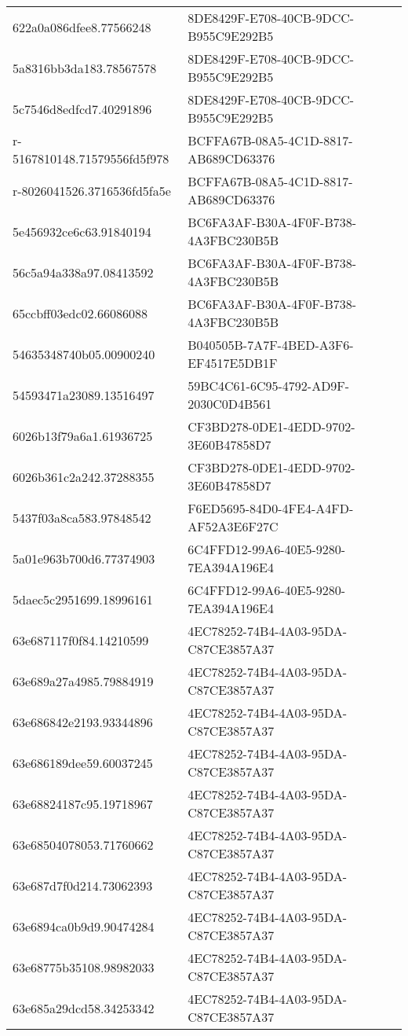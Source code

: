 \begin{tabular}{ll}
622a0a086dfee8.77566248 & 8DE8429F-E708-40CB-9DCC-B955C9E292B5 \\
5a8316bb3da183.78567578 & 8DE8429F-E708-40CB-9DCC-B955C9E292B5 \\
5c7546d8edfcd7.40291896 & 8DE8429F-E708-40CB-9DCC-B955C9E292B5 \\
r-5167810148.71579556fd5f978 & BCFFA67B-08A5-4C1D-8817-AB689CD63376 \\
r-8026041526.3716536fd5fa5e & BCFFA67B-08A5-4C1D-8817-AB689CD63376 \\
5e456932ce6c63.91840194 & BC6FA3AF-B30A-4F0F-B738-4A3FBC230B5B \\
56c5a94a338a97.08413592 & BC6FA3AF-B30A-4F0F-B738-4A3FBC230B5B \\
65ccbff03edc02.66086088 & BC6FA3AF-B30A-4F0F-B738-4A3FBC230B5B \\
54635348740b05.00900240 & B040505B-7A7F-4BED-A3F6-EF4517E5DB1F \\
54593471a23089.13516497 & 59BC4C61-6C95-4792-AD9F-2030C0D4B561 \\
6026b13f79a6a1.61936725 & CF3BD278-0DE1-4EDD-9702-3E60B47858D7 \\
6026b361c2a242.37288355 & CF3BD278-0DE1-4EDD-9702-3E60B47858D7 \\
5437f03a8ca583.97848542 & F6ED5695-84D0-4FE4-A4FD-AF52A3E6F27C \\
5a01e963b700d6.77374903 & 6C4FFD12-99A6-40E5-9280-7EA394A196E4 \\
5daec5c2951699.18996161 & 6C4FFD12-99A6-40E5-9280-7EA394A196E4 \\
63e687117f0f84.14210599 & 4EC78252-74B4-4A03-95DA-C87CE3857A37 \\
63e689a27a4985.79884919 & 4EC78252-74B4-4A03-95DA-C87CE3857A37 \\
63e686842e2193.93344896 & 4EC78252-74B4-4A03-95DA-C87CE3857A37 \\
63e686189dee59.60037245 & 4EC78252-74B4-4A03-95DA-C87CE3857A37 \\
63e68824187c95.19718967 & 4EC78252-74B4-4A03-95DA-C87CE3857A37 \\
63e68504078053.71760662 & 4EC78252-74B4-4A03-95DA-C87CE3857A37 \\
63e687d7f0d214.73062393 & 4EC78252-74B4-4A03-95DA-C87CE3857A37 \\
63e6894ca0b9d9.90474284 & 4EC78252-74B4-4A03-95DA-C87CE3857A37 \\
63e68775b35108.98982033 & 4EC78252-74B4-4A03-95DA-C87CE3857A37 \\
63e685a29dcd58.34253342 & 4EC78252-74B4-4A03-95DA-C87CE3857A37 \\

\end{tabular}
